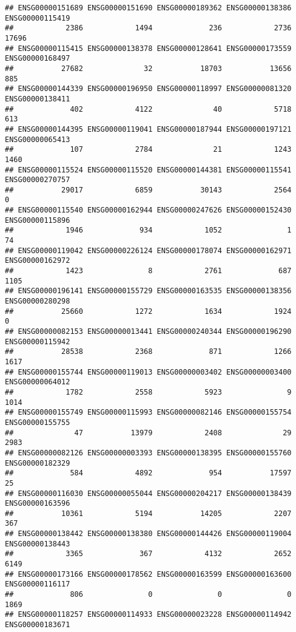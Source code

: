 \documentclass[
]{article}
\begin{document}
\begin{verbatim}
## ENSG00000151689 ENSG00000151690 ENSG00000189362 ENSG00000138386 ENSG00000115419 
##            2386            1494             236            2736           17696 
## ENSG00000115415 ENSG00000138378 ENSG00000128641 ENSG00000173559 ENSG00000168497 
##           27682              32           18703           13656             885 
## ENSG00000144339 ENSG00000196950 ENSG00000118997 ENSG00000081320 ENSG00000138411 
##             402            4122              40            5718             613 
## ENSG00000144395 ENSG00000119041 ENSG00000187944 ENSG00000197121 ENSG00000065413 
##             107            2784              21            1243            1460 
## ENSG00000115524 ENSG00000115520 ENSG00000144381 ENSG00000115541 ENSG00000270757 
##           29017            6859           30143            2564               0 
## ENSG00000115540 ENSG00000162944 ENSG00000247626 ENSG00000152430 ENSG00000115896 
##            1946             934            1052               1              74 
## ENSG00000119042 ENSG00000226124 ENSG00000178074 ENSG00000162971 ENSG00000162972 
##            1423               8            2761             687            1105 
## ENSG00000196141 ENSG00000155729 ENSG00000163535 ENSG00000138356 ENSG00000280298 
##           25660            1272            1634            1924               0 
## ENSG00000082153 ENSG00000013441 ENSG00000240344 ENSG00000196290 ENSG00000115942 
##           28538            2368             871            1266            1617 
## ENSG00000155744 ENSG00000119013 ENSG00000003402 ENSG00000003400 ENSG00000064012 
##            1782            2558            5923               9            1014 
## ENSG00000155749 ENSG00000115993 ENSG00000082146 ENSG00000155754 ENSG00000155755 
##              47           13979            2408              29            2983 
## ENSG00000082126 ENSG00000003393 ENSG00000138395 ENSG00000155760 ENSG00000182329 
##             584            4892             954           17597              25 
## ENSG00000116030 ENSG00000055044 ENSG00000204217 ENSG00000138439 ENSG00000163596 
##           10361            5194           14205            2207             367 
## ENSG00000138442 ENSG00000138380 ENSG00000144426 ENSG00000119004 ENSG00000138443 
##            3365             367            4132            2652            6149 
## ENSG00000173166 ENSG00000178562 ENSG00000163599 ENSG00000163600 ENSG00000116117 
##             806               0               0               0            1869 
## ENSG00000118257 ENSG00000114933 ENSG00000023228 ENSG00000114942 ENSG00000183671 

\end{verbatim}
\end{document}
